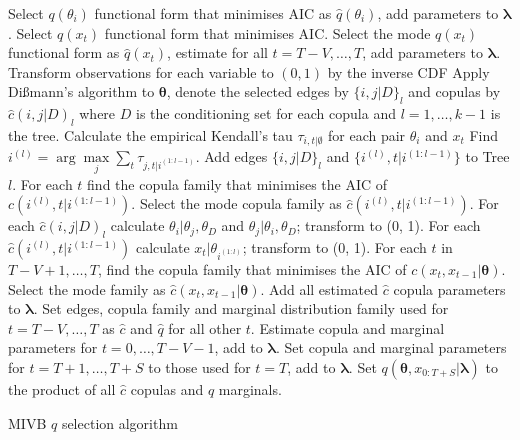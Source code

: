 \documentclass[12pt,a4paper]{article}%
\numberwithin{equation}{section}
\begin{document}
\begin{algorithm}[H]
  {
   Select $q(\theta_i)$ functional form that minimises AIC as $\hat{q}(\theta_i)$, add parameters to $\boldsymbol{\lambda}$.\;
 }
  {
  Select $q(x_t)$ functional form that minimises AIC. \;
 }
 Select the mode $q(x_t)$ functional form as $\hat{q}(x_t)$, estimate for all $t = T-V, \dots, T$, add parameters to $\boldsymbol{\lambda}$.\;
 Transform observations for each variable to $(0, 1)$ by the inverse CDF\;
 Apply Di{\ss}mann's algorithm to $\boldsymbol{\theta}$, denote the selected edges by $\{i, j | D \}_l$ and copulas by $\hat{c}(i, j | D)_l$ where $D$ is the conditioning set for each copula and $l = 1, \dots, k-1$ is the tree. \;
  {
   {
    Calculate the empirical Kendall's tau $\tau_{i, t | \emptyset}$ for each pair $\theta_i$ and $x_t$ \;
  } 
  Find $i^{(l)} = \arg \underset{j}{\max} \sum_t \tau_{j, t | i^{(1:l-1)}}$. \;
  Add edges $\{i, j | D\}_l$ and $\{i^{(l)}, t |  i^{(1:l-1)}\}$ to Tree $l$. \;
  For each $t$ find the copula family that minimises the AIC of $c(i^{(l)}, t |i^{(1:l-1)})$.\;
  Select the mode copula family as $\hat{c}(i^{(l)}, t |i^{(1:l-1)})$.\;
  For each $\hat{c}(i, j | D)_l$ calculate $\theta_i | \theta_j, \theta_D$ and $\theta_j | \theta_i, \theta_D$; transform to (0, 1).\;
  For each $\hat{c}(i^{(l)}, t |i^{(1:l-1)})$ calculate $x_t | \theta_{i^{(1:l)}}$; transform to (0, 1).\;
 }
  For each $t$ in $T-V+1, \dots, T$, find the copula family that minimises the AIC of $c(x_t, x_{t-1} | \boldsymbol{\theta}).$ \;
  Select the mode family as $\hat{c}(x_t, x_{t-1} | \boldsymbol{\theta})$. \;
  Add all estimated $\hat{c}$ copula parameters to $\boldsymbol{\lambda}$. \;
  Set edges, copula family and marginal distribution family used for $t = T-V, \dots, T$ as $\hat{c}$ and $\hat{q}$ for all other $t$. \;
  Estimate copula and marginal parameters for $t = 0, \dots, T-V-1$, add to $\boldsymbol{\lambda}$. \;
  Set copula and marginal parameters for $t = T+1, \dots, T+S$ to those used for $t = T$, add to $\boldsymbol{\lambda}$.\;
  Set $q(\boldsymbol{\theta}, x_{0:T+S} | \boldsymbol{\lambda})$ to the product of all $\hat{c}$ copulas and $\hat{q}$ marginals.\;
  \caption{MIVB $q$ selection algorithm}
  \label{alg:MIVB}
\end{algorithm}
\end{document}
